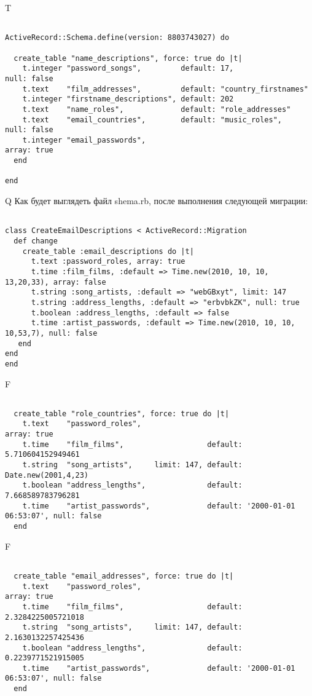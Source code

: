 T
\begin{verbatim}

ActiveRecord::Schema.define(version: 8803743027) do

  create_table "name_descriptions", force: true do |t|
    t.integer "password_songs",         default: 17,                   null: false
    t.text    "film_addresses",         default: "country_firstnames"
    t.integer "firstname_descriptions", default: 202
    t.text    "name_roles",             default: "role_addresses"
    t.text    "email_countries",        default: "music_roles",        null: false
    t.integer "email_passwords",                                                    array: true
  end

end
\end{verbatim}

Q
Как будет выглядеть файл shema.rb, после выполнения следующей миграции:

\begin{verbatim}

class CreateEmailDescriptions < ActiveRecord::Migration 
  def change 
    create_table :email_descriptions do |t| 
      t.text :password_roles, array: true
      t.time :film_films, :default => Time.new(2010, 10, 10, 13,20,33), array: false
      t.string :song_artists, :default => "webGBxyt", limit: 147
      t.string :address_lengths, :default => "erbvbkZK", null: true
      t.boolean :address_lengths, :default => false
      t.time :artist_passwords, :default => Time.new(2010, 10, 10, 10,53,7), null: false
   end
end
end
\end{verbatim}

F
\begin{verbatim}

  create_table "role_countries", force: true do |t|
    t.text    "password_roles",                                                            array: true
    t.time    "film_films",                   default: 5.710604152949461
    t.string  "song_artists",     limit: 147, default: Date.new(2001,4,23)
    t.boolean "address_lengths",              default: 7.668589783796281
    t.time    "artist_passwords",             default: '2000-01-01 06:53:07', null: false
  end

\end{verbatim}

F
\begin{verbatim}

  create_table "email_addresses", force: true do |t|
    t.text    "password_roles",                                                            array: true
    t.time    "film_films",                   default: 2.3284225005721018
    t.string  "song_artists",     limit: 147, default: 2.1630132257425436
    t.boolean "address_lengths",              default: 0.2239771521915005
    t.time    "artist_passwords",             default: '2000-01-01 06:53:07', null: false
  end

\end{verbatim}

